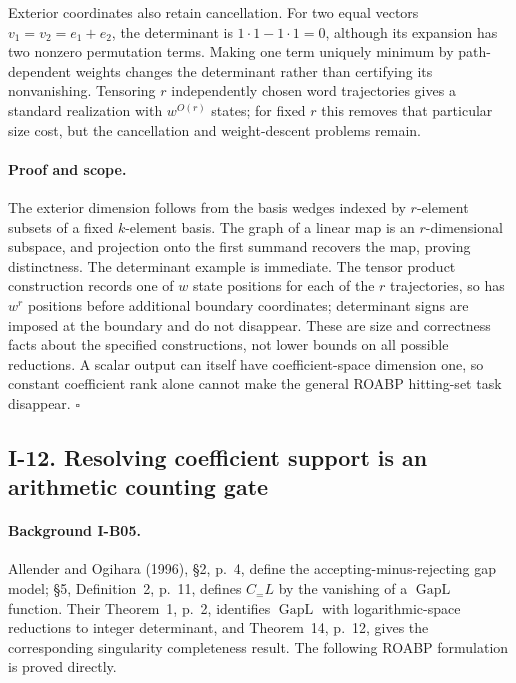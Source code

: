 \documentclass[11pt,a4paper]{article}
\theoremstyle{definition}\newtheorem{definition}{Definition}
\begin{document}
Exterior coordinates also retain cancellation.  For two equal
vectors $v_1=v_2=e_1+e_2$, the determinant is
$1\cdot1-1\cdot1=0$, although its expansion has two nonzero
permutation terms.  Making one term uniquely minimum by
path-dependent weights changes the determinant rather than
certifying its nonvanishing.  Tensoring $r$ independently chosen
word trajectories gives a standard realization with $w^{O(r)}$
states; for fixed $r$ this removes that particular size cost,
but the cancellation and weight-descent problems remain.

\paragraph{Proof and scope.}
The exterior dimension follows from the basis wedges indexed
by $r$-element subsets of a fixed $k$-element basis.  The graph
of a linear map is an $r$-dimensional subspace, and projection
onto the first summand recovers the map, proving distinctness.
The determinant example is immediate.  The tensor product
construction records one of $w$ state positions for each of
the $r$ trajectories, so has $w^r$ positions before additional
boundary coordinates; determinant signs are imposed at the
boundary and do not disappear.  These are size and correctness
facts about the specified constructions, not lower bounds on
all possible reductions.  A scalar output can itself have
coefficient-space dimension one, so constant coefficient rank
alone cannot make the general ROABP hitting-set task disappear.
\hfill$\square$

\subsection{I-12. Resolving coefficient support is an arithmetic counting gate}
\label{I-12}

\paragraph{Background I-B05.}
Allender and Ogihara (1996), \S2, p.~4, define the accepting-minus-rejecting
gap model; \S5, Definition~2, p.~11, defines $C_{=}L$ by the vanishing
of a $\operatorname{GapL}$ function.  Their Theorem~1, p.~2, identifies
$\operatorname{GapL}$ with logarithmic-space reductions to integer
determinant, and Theorem~14, p.~12, gives the corresponding singularity
completeness result.  The following ROABP formulation is proved directly.
\end{document}
